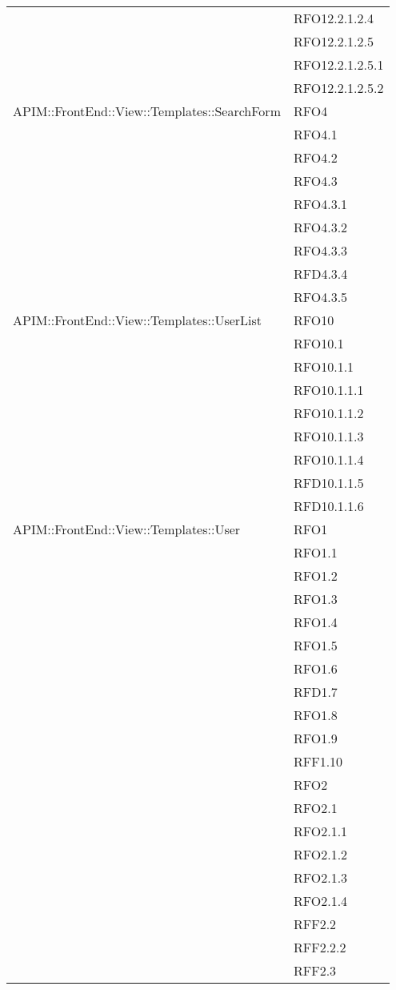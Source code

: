 \begin{longtable}{ p{12cm} | p{4cm} }
& RFO12.2.1.2.4 \\
& RFO12.2.1.2.5 \\
& RFO12.2.1.2.5.1 \\
& RFO12.2.1.2.5.2 \\    \hline
		    APIM::FrontEnd::View::Templates::SearchForm
		    & RFO4 \\
		    & RFO4.1 \\
		    & RFO4.2 \\
		    & RFO4.3 \\
		    & RFO4.3.1 \\
		    & RFO4.3.2 \\
		    & RFO4.3.3 \\
		    & RFD4.3.4 \\
		    & RFO4.3.5 \\
		    \hline
		    APIM::FrontEnd::View::Templates::UserList
		    		 		    & RFO10 \\
& RFO10.1 \\
& RFO10.1.1 \\
& RFO10.1.1.1 \\
& RFO10.1.1.2 \\
& RFO10.1.1.3 \\
& RFO10.1.1.4 \\
& RFD10.1.1.5 \\
& RFD10.1.1.6 \\
		    \hline   
		    APIM::FrontEnd::View::Templates::User
		    	& RFO1 \\
		    & RFO1.1 \\
		    & RFO1.2 \\
		    & RFO1.3 \\
		    & RFO1.4 \\
		    & RFO1.5 \\
		    & RFO1.6 \\
		    & RFD1.7 \\
		    & RFO1.8 \\
		    & RFO1.9 \\
		    & RFF1.10 \\
		    & RFO2 \\
		    & RFO2.1 \\
		    & RFO2.1.1 \\
		    & RFO2.1.2 \\
		    & RFO2.1.3 \\
		    & RFO2.1.4 \\
		    & RFF2.2 \\
		    & RFF2.2.2 \\
		    & RFF2.3 \\

\end{longtable}
